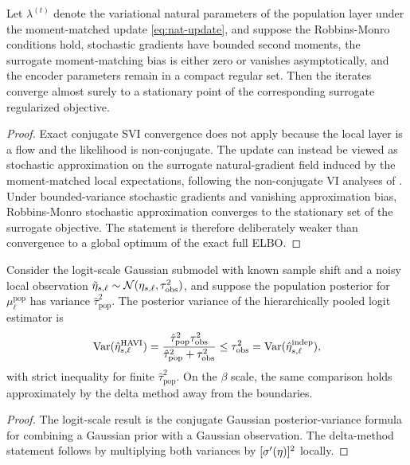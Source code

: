 \begin{proposition}
\label{prop:svi}
Let $\lambda^{(t)}$ denote the variational natural parameters of the population layer under the moment-matched update \eqref{eq:nat-update}, and suppose the Robbins-Monro conditions hold, stochastic gradients have bounded second moments, the surrogate moment-matching bias is either zero or vanishes asymptotically, and the encoder parameters remain in a compact regular set. Then the iterates converge almost surely to a stationary point of the corresponding surrogate regularized objective.
\end{proposition}
\begin{proof}
Exact conjugate SVI convergence does not apply because the local layer is a flow and the likelihood is non-conjugate. The update can instead be viewed as stochastic approximation on the surrogate natural-gradient field induced by the moment-matched local expectations, following the non-conjugate VI analyses of \citet{khan2017cvi,lin2019natgrad}. Under bounded-variance stochastic gradients and vanishing approximation bias, Robbins-Monro stochastic approximation converges to the stationary set of the surrogate objective. The statement is therefore deliberately weaker than convergence to a global optimum of the exact full ELBO.
\end{proof}

\begin{proposition}
\label{prop:pooling}
Consider the logit-scale Gaussian submodel with known sample shift and a noisy local observation $\tilde\eta_{s,\ell}\sim\mathcal{N}(\eta_{s,\ell},\tau_{\mathrm{obs}}^2)$, and suppose the population posterior for $\mu^{\mathrm{pop}}_\ell$ has variance $\hat\tau_{\mathrm{pop}}^2$. The posterior variance of the hierarchically pooled logit estimator is
\[
\mathrm{Var}(\hat\eta^{\mathrm{HAVI}}_{s,\ell})=\frac{\hat\tau_{\mathrm{pop}}^2\tau_{\mathrm{obs}}^2}{\hat\tau_{\mathrm{pop}}^2+\tau_{\mathrm{obs}}^2}\le \tau_{\mathrm{obs}}^2=\mathrm{Var}(\hat\eta^{\mathrm{indep}}_{s,\ell}),
\]
with strict inequality for finite $\hat\tau_{\mathrm{pop}}^2$. On the $\beta$ scale, the same comparison holds approximately by the delta method away from the boundaries.
\end{proposition}
\begin{proof}
The logit-scale result is the conjugate Gaussian posterior-variance formula for combining a Gaussian prior with a Gaussian observation. The delta-method statement follows by multiplying both variances by $[\sigma'(\eta)]^2$ locally.
\end{proof}

